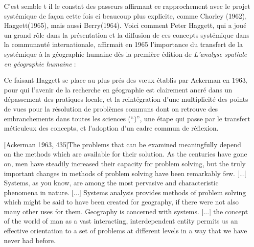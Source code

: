 C'est semble t il le constat des passeurs affirmant ce rapprochement avec le projet systémique de façon cette fois ci beaucoup plus explicite, comme Chorley (1962), Haggett(1965), mais aussi Berry(1964). Voici comment Peter Haggett, qui a joué un grand rôle dans la présentation et la diffusion de ces concepts systémique dans la communauté internationale, affirmait en 1965 l'importance du transfert de la systémique à la géographie humaine dès la première édition de \textit{L’analyse spatiale en géographie humaine} : 

Ce faisant Haggett se place au plus prés des vœux établis par Ackerman en 1963, pour qui l'avenir de la recherche en géographie est clairement ancré dans un dépassement des pratiques locale, et la reintégration d'une multiplicité des points de vues pour la résolution de problèmes communs dont on retrouve des embranchements dans toutes les sciences (\foreignquote{overriding problems}), une étape qui passe par le transfert méticuleux des concepts, et l'adoption d'un cadre commun de réflexion.

[Ackerman 1963, 435]{The problems that can be examined meaningfully depend on the methods which are available for their solution. As the centuries have gone on, men have steadily increased their capacity for problem solving, but the truly important changes in methods of problem solving have been remarkably few. [...] Systems, as you know, are among the most pervasive and characteristic phenomena in nature. [...] Systems analysis provides methods of problem solving which might be said to have been created for geography, if there were not also many other uses for them. Geography is concerned with systems. [...] the concept of the world of man as a vast interacting, interdependent entity permits us an effective orientation to a set of problems at different levels in a way that we have never had before.}

